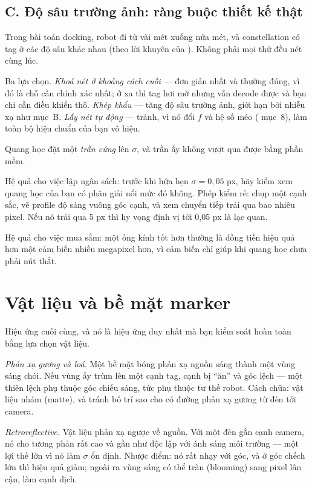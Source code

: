 \documentclass[../../marker.tex]{subfiles}
\begin{document}
\subsection{C. Độ sâu trường ảnh: ràng buộc thiết kế thật}

Trong bài toán docking, robot đi từ vài mét xuống nửa mét, và constellation có tag ở các độ sâu khác nhau (theo lời khuyên của ). Không phải mọi thứ đều nét cùng lúc.

Ba lựa chọn. \emph{Khoá nét ở khoảng cách cuối} --- đơn giản nhất và thường đúng, vì đó là chỗ cần chính xác nhất; ở xa thì tag hơi mờ nhưng vẫn decode được và bạn chỉ cần điều khiển thô. \emph{Khép khẩu} --- tăng độ sâu trường ảnh, giới hạn bởi nhiễu xạ như mục~B. \emph{Lấy nét tự động} --- tránh, vì nó đổi \(f\) và hệ số méo ( mục~8), làm toàn bộ hiệu chuẩn của bạn vô hiệu.

\begin{cannho}
Quang học đặt một \emph{trần cứng} lên \(\sigma\), và trần ấy không vượt qua được bằng phần mềm.

Hệ quả cho việc lập ngân sách: trước khi hứa hẹn \(\sigma = 0{,}05\) px, hãy kiểm xem quang học của bạn có phân giải nổi mức đó không. Phép kiểm rẻ: chụp một cạnh sắc, vẽ profile độ sáng vuông góc cạnh, và xem chuyển tiếp trải qua bao nhiêu pixel. Nếu nó trải qua 5 px thì hy vọng định vị tới 0,05 px là lạc quan.

Hệ quả cho việc mua sắm: một ống kính tốt hơn thường là đồng tiền hiệu quả hơn một cảm biến nhiều megapixel hơn, vì cảm biến chỉ giúp khi quang học chưa phải nút thắt.
\end{cannho}

\section{Vật liệu và bề mặt marker}

Hiệu ứng cuối cùng, và nó là hiệu ứng duy nhất mà bạn kiểm soát hoàn toàn bằng lựa chọn vật liệu.

\emph{Phản xạ gương và loá.} Một bề mặt bóng phản xạ nguồn sáng thành một vùng sáng chói. Nếu vùng ấy trùm lên một cạnh tag, cạnh bị ``ăn'' và góc lệch --- một thiên lệch phụ thuộc góc chiếu sáng, tức phụ thuộc tư thế robot. Cách chữa: vật liệu nhám (matte), và tránh bố trí sao cho có đường phản xạ gương từ đèn tới camera.

\emph{Retroreflective.} Vật liệu phản xạ ngược về nguồn. Với một đèn gắn cạnh camera, nó cho tương phản rất cao và gần như độc lập với ánh sáng môi trường --- một lợi thế lớn vì nó làm \(\sigma\) ổn định. Nhược điểm: nó rất nhạy với góc, và ở góc chếch lớn thì hiệu quả giảm; ngoài ra vùng sáng có thể tràn (blooming) sang pixel lân cận, làm cạnh dịch.
\end{document}
